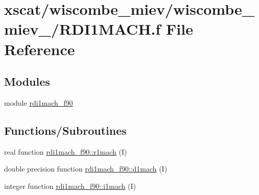 \hypertarget{_r_d_i1_m_a_c_h_8f}{}\section{xscat/wiscombe\+\_\+miev/wiscombe\+\_\+miev\+\_/\+R\+D\+I1\+M\+A\+CH.f File Reference}
\label{_r_d_i1_m_a_c_h_8f}
\subsection*{Modules}
\begin{DoxyCompactItemize}
\item 
module \hyperlink{namespacerdi1mach__f90}{rdi1mach\+\_\+f90}
\end{DoxyCompactItemize}
\subsection*{Functions/\+Subroutines}
\begin{DoxyCompactItemize}
\item 
real function \hyperlink{namespacerdi1mach__f90_a980c645c9cef138b3dbc0b2f1ab2e04d}{rdi1mach\+\_\+f90\+::r1mach} (I)
\item 
double precision function \hyperlink{namespacerdi1mach__f90_a71577a35707793435a9266e3b470c391}{rdi1mach\+\_\+f90\+::d1mach} (I)
\item 
integer function \hyperlink{namespacerdi1mach__f90_a772ea48c9a61f01ff4237e78bb31c13d}{rdi1mach\+\_\+f90\+::i1mach} (I)
\end{DoxyCompactItemize}
